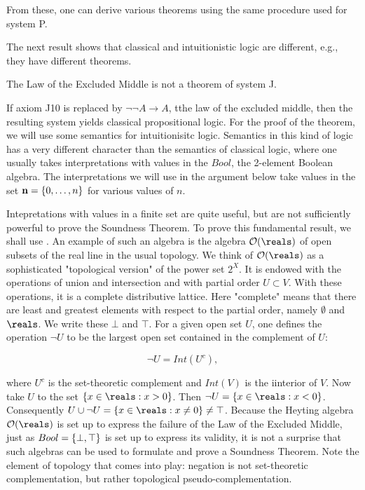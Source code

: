 From these, one can derive various theorems using the same procedure used for system P.

The next result shows that classical  and intuitionistic logic are different, e.g., they have different theorems.

\begin{theorem}  \label{lem} The Law of the Excluded Middle is not a theorem of system J.
\end{theorem}


If axiom J10 is replaced by $\neg \neg A \to A$, tthe law of the excluded middle, then the resulting system yields classical propositional logic.
For the proof of the theorem, we will use some semantics for intuitionisitc logic.  Semantics in this kind of logic has a very different character than the semantics of classical logic, where one usually takes interpretations with values in the $Bool$, the 2-element Boolean algebra.  The interpretations we will use in the argument below take values in the set  $\mathbf{n} = \{ 0, \ldots, n \}$ for various values of $n$.

Intepretations with values in a finite set are quite useful, but are not sufficiently powerful to prove the Soundness Theorem. To prove this fundamental result, we shall use .  An example of such an algebra is the algebra $\opensets(\reals)$ of open subsets of the real line in the usual topology.  We think of $\opensets(\reals)$ as a sophisticated "topological version" of the power set $2^X$. It is endowed with the operations of union and intersection and with partial order $U \subset V$.  With these operations, it is a complete distributive lattice. Here "complete" means that there are least and greatest elements with respect to the partial order, namely $\emptyset$ and $\reals$.  We write these $\bot$ and $\top$. For a given open set $U$, one defines the operation $\neg U$ to be the largest open set contained in the complement of $U$:

$$
\neg U = Int(U^c),
$$

where $U^c$ is the set-theoretic complement and $Int(V)$ is the iinterior of $V$.
  Now take $U$ to the set $\set{ x \in \reals :  x > 0}$.  Then $\neg U = \set{ x \in \reals :  x < 0}$.    Consequently $U \cup \neg U = \set{x \in \reals : x \ne 0} \ne \top$.  Because the Heyting algebra $\opensets(\reals)$ is set up to express the failure of the Law of the Excluded Middle, just as $Bool = \{ \bot, \top \}$ is set up to express its validity, it is not a surprise that such algebras can be used to formulate and prove a Soundness Theorem.  Note the element of topology that comes into play: negation is not set-theoretic complementation, but rather topological pseudo-complementation.

